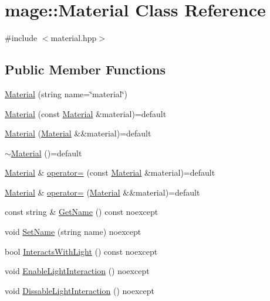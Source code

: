 \hypertarget{classmage_1_1_material}{}\section{mage\+:\+:Material Class Reference}
\label{classmage_1_1_material}


{\ttfamily \#include $<$material.\+hpp$>$}

\subsection*{Public Member Functions}
\begin{DoxyCompactItemize}
\item 
\hyperlink{classmage_1_1_material_a6f3ba50e9dfd73ce41473563d0ab3c20}{Material} (string name=\char`\"{}material\char`\"{})
\item 
\hyperlink{classmage_1_1_material_abed630412cdc4a6281389d128ec4b5f3}{Material} (const \hyperlink{classmage_1_1_material}{Material} \&material)=default
\item 
\hyperlink{classmage_1_1_material_a41bfbc2bfa16e3694ac443d390b804c2}{Material} (\hyperlink{classmage_1_1_material}{Material} \&\&material)=default
\item 
\hyperlink{classmage_1_1_material_a4ca65b7e24144ee08dd1ce8d0eda9284}{$\sim$\+Material} ()=default
\item 
\hyperlink{classmage_1_1_material}{Material} \& \hyperlink{classmage_1_1_material_a7ebc9986924ca13ae8468005518dcfc7}{operator=} (const \hyperlink{classmage_1_1_material}{Material} \&material)=default
\item 
\hyperlink{classmage_1_1_material}{Material} \& \hyperlink{classmage_1_1_material_a500a2ebe99d4d7b3be5bf57b6bff62a1}{operator=} (\hyperlink{classmage_1_1_material}{Material} \&\&material)=default
\item 
const string \& \hyperlink{classmage_1_1_material_a9edb2f437eca07c6c12c24d10ec30eb3}{Get\+Name} () const noexcept
\item 
void \hyperlink{classmage_1_1_material_ad1083b74b6939f909eb471e0f45f63cb}{Set\+Name} (string name) noexcept
\item 
bool \hyperlink{classmage_1_1_material_a9bb48fe0f9f8d2c21073bdf650957bd6}{Interacts\+With\+Light} () const noexcept
\item 
void \hyperlink{classmage_1_1_material_abbcdcc3a9cb44c854212508c8419aa7f}{Enable\+Light\+Interaction} () noexcept
\item 
void \hyperlink{classmage_1_1_material_ab4b92a53ee74e401c518eea299fb4e0b}{Dissable\+Light\+Interaction} () noexcept

\end{DoxyCompactItemize}
